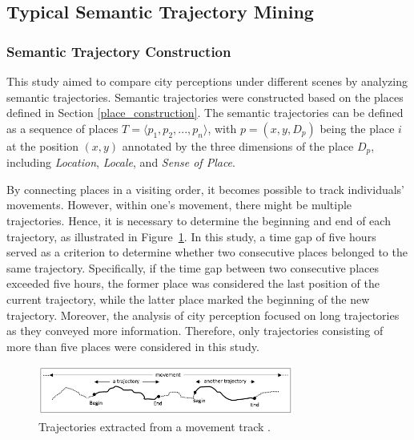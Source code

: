 \documentclass{article}
\theoremstyle{definition}
\theoremstyle{remark}
\begin{document}
\subsection{Typical Semantic Trajectory Mining} \label{typical_semantic_trajectory_mining}

\subsubsection{Semantic Trajectory Construction}
This study aimed to compare city perceptions under different scenes by analyzing semantic trajectories. Semantic trajectories were constructed based on the places defined in Section \ref{place_construction}. The semantic trajectories can be defined as a sequence of places $T = \langle p_{1}, p_{2}, ..., p_{n} \rangle$, with $p = (x,y,D_{p})$ being the place $i$ at the position $(x,y)$ annotated by the three dimensions of the place $D_{p}$, including \textit{Location}, \textit{Locale}, and \textit{Sense of Place}.

By connecting places in a visiting order, it becomes possible to track individuals' movements. However, within one's movement, there might be multiple trajectories. Hence, it is necessary to determine the beginning and end of each trajectory, as illustrated in Figure~\ref{fig:trajectory_begin_end}. In this study, a time gap of five hours served as a criterion to determine whether two consecutive places belonged to the same trajectory. Specifically, if the time gap between two consecutive places exceeded five hours, the former place was considered the last position of the current trajectory, while the latter place marked the beginning of the new trajectory. Moreover, the analysis of city perception focused on long trajectories as they conveyed more information. Therefore, only trajectories consisting of more than five places were considered in this study.

\begin{figure} [!h]
\centering
\includegraphics[width=0.75\textwidth]{figures/begin_end.png}
\caption{\label{fig:trajectory_begin_end}Trajectories extracted from a movement track \citep{parent_semantic_2013}.}
\end{figure}
\end{document}
